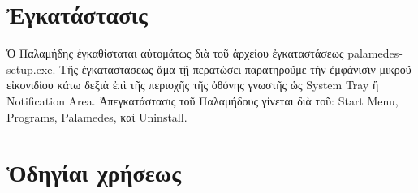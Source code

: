 \documentclass[12pt,a4paper]{article}
\begin{document}
\section*{Ἐγκατάστασις}
  Ὁ Παλαμήδης ἐγκαθίσταται αὐτομάτως διὰ τοῦ ἀρχείου ἐγκαταστάσεως
  \textsf{palamedes-setup.exe}. Τῆς ἐγκαταστάσεως ἅμα τῇ περατώσει παρατηροῦμε
  τὴν ἐμφάνισιν μικροῦ εἰκονιδίου κάτω δεξιὰ ἐπὶ τῆς περιοχῆς τῆς ὀθόνης
  γνωστῆς ὡς System Tray ἢ Notification Area. 
  Ἀπεγκατάστασις τοῦ Παλαμήδους γίνεται διὰ τοῦ: 
  \textsf{Start Menu, Programs, Palamedes}, καὶ \textsf{Uninstall}.

\section*{Ὁδηγίαι χρήσεως}
\end{document}
